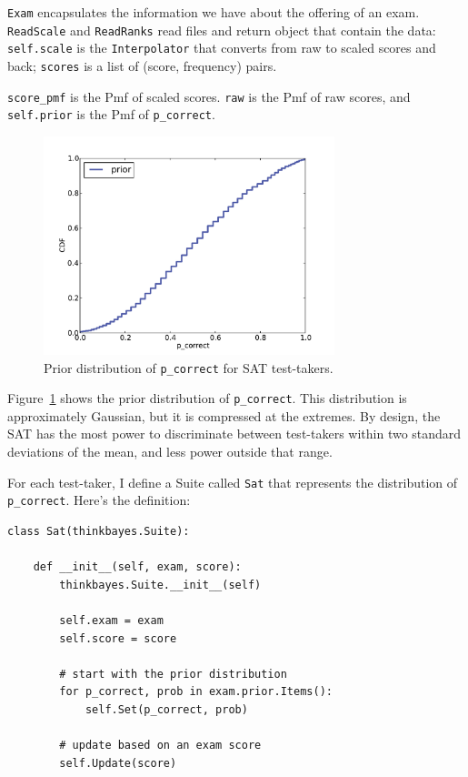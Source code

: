 \documentclass[12pt]{book}
\begin{document}
{\tt Exam} encapsulates the information we have about the offering
of an exam.
{\tt ReadScale} and {\tt ReadRanks} read files and return
object that contain the data:
{\tt self.scale} is the {\tt Interpolator} that converts
from raw to scaled scores and back;  {\tt scores} is a list
of (score, frequency) pairs.

\verb"score_pmf" is the Pmf of
scaled scores.   {\tt raw} is the Pmf of raw scores, and
{\tt self.prior} is the Pmf of \verb"p_correct".

\begin{figure}
\centerline{\includegraphics[height=2.5in]{figs/sat_prior.pdf}}
\caption{Prior distribution of {\tt p\_correct} for SAT test-takers.}
\label{fig.satprior}
\end{figure}

Figure~\ref{fig.satprior} shows the prior distribution of
\verb"p_correct".  This distribution is approximately Gaussian, but it
is compressed at the extremes.  By design, the SAT has the most power
to discriminate between test-takers within two standard deviations of
the mean, and less power outside that range.

For each test-taker, I define a Suite called {\tt Sat} that
represents the distribution of \verb"p_correct".  Here's the definition:

\begin{verbatim}
class Sat(thinkbayes.Suite):

    def __init__(self, exam, score):
        thinkbayes.Suite.__init__(self)

        self.exam = exam
        self.score = score

        # start with the prior distribution
        for p_correct, prob in exam.prior.Items():
            self.Set(p_correct, prob)

        # update based on an exam score
        self.Update(score)
\end{verbatim}
\end{document}
